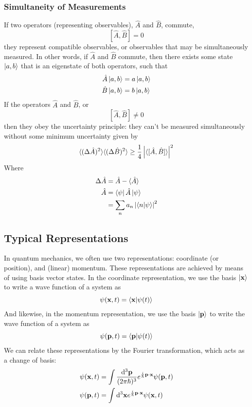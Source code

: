 \documentclass[a4paper]{article}
\begin{document}
\subsubsection{Simultaneity of Measurements}
If two operators (representing observables), $\hat{A}$ and $\hat{B}$, commute,
\[ [\hat{A},\hat{B}] = 0 \]
they represent compatible observables, or observables that may be
simultaneously measured. In other words, if $\hat{A}$ and $\hat{B}$ commute,
then there exists some state $\left\lvert a,b\right\rangle$ that is an eigenstate of both
operators, such that
\begin{align*}
	\hat{A}\left\lvert a,b\right\rangle &= a\left\lvert a,b\right\rangle\\
	\hat{B}\left\lvert a,b\right\rangle &= b\left\lvert a,b\right\rangle
\end{align*}
If the operators $\hat{A}$ and $\hat{B}$, or
\[ [\hat{A},\hat{B}] \neq 0 \]
then they obey the uncertainty principle: they can't be measured simultaneously
without some minimum uncertainty given by
\[
	\langle(\Delta\hat{A})^2\rangle \langle(\Delta\hat{B})^2\rangle \geq
	\frac14\left\lvert \langle[\hat{A},\hat{B}]\rangle\right\rvert^2
\]
Where
\begin{align*}
	\Delta\hat{A} &= \hat{A} - \langle\hat{A}\rangle\\
	\hat{A} &= \left\langle \psi \right\rvert\hat{A}\left\lvert \psi\right\rangle\\
		&= \sum_n a_n \left\lvert \left\langle n\middle\vert \psi \right\rangle\right\rvert^2
\end{align*}

\subsection{Typical Representations}
In quantum mechanics, we often use two representations: coordinate (or
position), and (linear) momentum. These representations are achieved by means
of using basis vector states. In the coordinate representation, we use the
basis $\left\lvert \boldsymbol{\mathbf{x}}\right\rangle$ to write a wave function of a system as
\[ \psi(\boldsymbol{\mathbf{x}},t) = \left\langle \boldsymbol{\mathbf{x}}\middle\vert \psi(t) \right\rangle \]
And likewise, in the momentum representation, we use the basis
$\left\lvert \boldsymbol{\mathbf{p}}\right\rangle$ to write the wave function of a system as
\[ \psi(\boldsymbol{\mathbf{p}},t) = \left\langle \boldsymbol{\mathbf{p}}\middle\vert \psi(t) \right\rangle \]
We can relate these representations by the Fourier transformation, which
acts as a change of basis:
\begin{align*}
	\psi(\boldsymbol{\mathbf{x}},t) &= \int \frac{\mathrm{d}^3\boldsymbol{\mathbf{p}}}{(2\pi\hslash)^3}
		e^{\frac{i}{\hslash}\boldsymbol{\mathbf{p}}\cdot\boldsymbol{\mathbf{x}}}\psi(\boldsymbol{\mathbf{p}},t)\\
	\psi(\boldsymbol{\mathbf{p}},t) &= \int \mathrm{d}^3\boldsymbol{\mathbf{x}}
		e^{\frac{i}{\hslash}\boldsymbol{\mathbf{p}}\cdot\boldsymbol{\mathbf{x}}}\psi(\boldsymbol{\mathbf{x}},t)
\end{align*}
\end{document}
